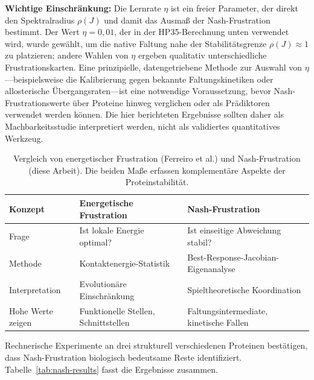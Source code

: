 \documentclass[12pt,a4paper]{article}
\theoremstyle{remark}
\begin{document}
\textbf{Wichtige Einschr\"ankung:} Die Lernrate $\eta$ ist ein freier Parameter, der direkt den Spektralradius $\rho(J)$ und damit das Ausma\ss{} der Nash-Frustration bestimmt. Der Wert $\eta = 0{,}01$, der in der HP35-Berechnung unten verwendet wird, wurde gew\"ahlt, um die native Faltung nahe der Stabilit\"atsgrenze $\rho(J) \approx 1$ zu platzieren; andere Wahlen von $\eta$ ergeben qualitativ unterschiedliche Frustrationskarten. Eine prinzipielle, datengetriebene Methode zur Auswahl von $\eta$---beispielsweise die Kalibrierung gegen bekannte Faltungskinetiken oder allosterische \"Ubergangsraten---ist eine notwendige Voraussetzung, bevor Nash-Frustrationswerte \"uber Proteine hinweg verglichen oder als Pr\"adiktoren verwendet werden k\"onnen. Die hier berichteten Ergebnisse sollten daher als Machbarkeitsstudie interpretiert werden, nicht als validiertes quantitatives Werkzeug.

\begin{table}[ht]
\centering
\caption{Vergleich von energetischer Frustration (Ferreiro et al.) und Nash-Frustration (diese Arbeit). Die beiden Ma\ss{}e erfassen komplement\"are Aspekte der Proteinstabilit\"at.}
\label{tab:frustration-comparison}
\begin{tabular}{lll}
\toprule
\textbf{Konzept} & \textbf{Energetische Frustration} & \textbf{Nash-Frustration} \\
\midrule
Frage & Ist lokale Energie optimal? & Ist einseitige Abweichung stabil? \\
Methode & Kontaktenergie-Statistik & Best-Response-Jacobian-Eigenanalyse \\
Interpretation & Evolution\"are Einschr\"ankung & Spieltheoretische Koordination \\
Hohe Werte zeigen & Funktionelle Stellen, Schnittstellen & Faltungsintermediate, kinetische Fallen \\
\bottomrule
\end{tabular}
\end{table}

Rechnerische Experimente an drei strukturell verschiedenen Proteinen best\"atigen, dass Nash-Frustration biologisch bedeutsame Reste identifiziert. Tabelle~\ref{tab:nash-results} fasst die Ergebnisse zusammen.
\end{document}

